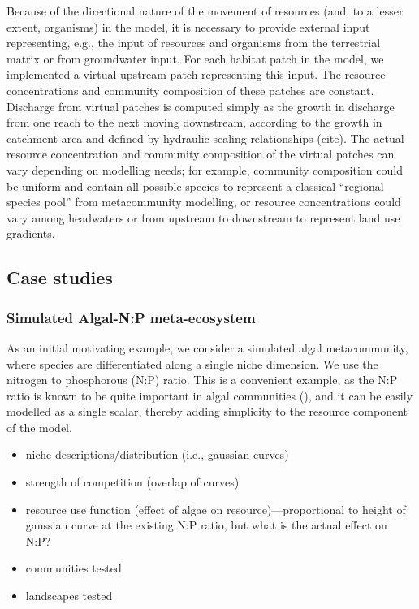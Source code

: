 \documentclass[11pt,a4paper]{article}
\begin{document}
Because of the directional nature of the movement of resources (and, to a lesser extent, organisms) in the model, it is necessary to provide external input representing, e.g., the input of resources and organisms from the terrestrial matrix or from groundwater input.
For each habitat patch in the model, we implemented a virtual upstream patch representing this input.
The resource concentrations and community composition of these patches are constant.
Discharge from virtual patches is computed simply as the growth in discharge from one reach to the next moving downstream, according to the growth in catchment area and defined by hydraulic scaling relationships (cite).
The actual resource concentration and community composition of the virtual patches can vary depending on modelling needs; for example, community composition could be uniform and contain all possible species to represent a classical “regional species pool” from metacommunity modelling, or resource concentrations could vary among headwaters or from upstream to downstream to represent land use gradients.


\subsection{Case studies}

\subsubsection{Simulated Algal-N:P meta-ecosystem}
As an initial motivating example, we consider a simulated algal metacommunity, where species are differentiated along a single niche dimension.
We use the nitrogen to phosphorous (N:P) ratio.
This is a convenient example, as the N:P ratio is known to be quite important in algal communities (), and it can be easily modelled as a single scalar, thereby adding simplicity to the resource component of the model.	

\begin{itemize}
	\item niche descriptions/distribution (i.e., gaussian curves)
	\item strength of competition (overlap of curves)
	\item resource use function (effect of algae on resource)---proportional to height of gaussian curve at the existing N:P ratio, but what is the actual effect on N:P?
	\item communities tested
	\item landscapes tested 
\end{itemize}
\end{document}

